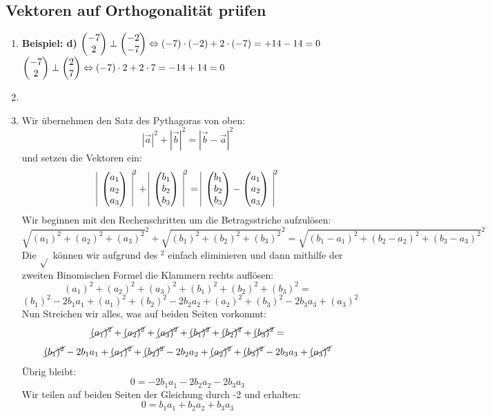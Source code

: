 \subsection{Vektoren auf Orthogonalität prüfen}
  \begin{enumerate}
  \item \textbf{Beispiel: d)}
    $ \begin{pmatrix} -7 \\ 2 \end{pmatrix}	\perp	\begin{pmatrix} -2 \\ -7 \end{pmatrix}	\Leftrightarrow	(-7)\cdot(-2)+2\cdot(-7)	=+14-14	= 0 $ \\
    $ \begin{pmatrix} -7 \\ 2 \end{pmatrix}	\perp	\begin{pmatrix} 2 \\ 7 \end{pmatrix}	\Leftrightarrow	(-7)\cdot2 + 2\cdot7		=-14+14	= 0 $
		
  \item
    
    
  \item
	Wir übernehmen den Satz des Pythagoras von oben: 
		$$|\vec{a}|^2 + |\vec{b}|^2 = |\vec{b} - \vec{a}|^2 $$
	und setzen die Vektoren ein:
		$$ \begin{array}{|c|}	\begin{pmatrix} a_{1} \\ a_{2} \\ a_{3} \end{pmatrix} \end{array} ^2 + \begin{array}{|c|}\begin{pmatrix} b_{1} \\ b_{2} \\ b_{3} \end{pmatrix} \end{array} ^2 = \begin{array}{|c|} \begin{pmatrix} b_{1} \\ b_{2} \\ b_{3} \end{pmatrix} -	\begin{pmatrix} a_{1} \\ a_{2} \\ a_{3} \end{pmatrix}\end{array} ^2  $$
	Wir beginnen mit den Rechenschritten um die Betragsstriche aufzulösen:
		$$ \sqrt{(a_1)^{2} + (a_{2})^2 + (a_{3})^2} ^2 + \sqrt{(b_1)^{2} + (b_{2})^2 + (b_{3})^2} ^2 = \sqrt{(b_1-a_1)^2 + (b_2-a_2)^2 + (b_3-a_3)^2}^2 $$
		Die $\sqrt{}$ können wir aufgrund des $^2$ einfach eliminieren und dann mithilfe der zweiten Binomischen Formel die Klammern rechts auflösen:
		$$ (a_1)^{2} + (a_2)^2 + (a_3)^2 + (b_1)^{2} + (b_2)^2 + (b_3)^2 = $$
		$$ (b_1)^2 - 2b_{1}a_{1} + (a_1)^2 + (b_2)^2 - 2b_{2}a_{2} + (a_2)^2 + (b_3)^2 - 2b_{3}a_{3} + (a_3)^2	$$
	Nun Streichen wir alles, was auf beiden Seiten vorkommt:
		$$ \cancel{(a_1)^{2}} + \cancel{(a_2)^2} + \cancel{(a_3)^2} + \cancel{(b_1)^2} + \cancel{(b_2)^2} + \cancel{(b_3)^2} =$$
		$$ \cancel{(b_1)^2} - 2b_{1}a_{1} + \cancel{(a_1)^2} + \cancel{(b_2)^2} - 2b_{2}a_{2} + \cancel{(a_2)^2} + \cancel{(b_3)^2} - 2b_{3}a_{3} + \cancel{(a_3)^2} $$
	Übrig bleibt:
		$$ 0 = 	- 2b_{1}a_{1} - 2b_{2}a_{2} - 2b_{3}a_{3} $$
	Wir teilen auf beiden Seiten der Gleichung durch -2 und erhalten: 
		$$ 0 = b_{1}a_{1} + b_{2}a_{2} + b_{3}a_{3} $$


\end{enumerate}
